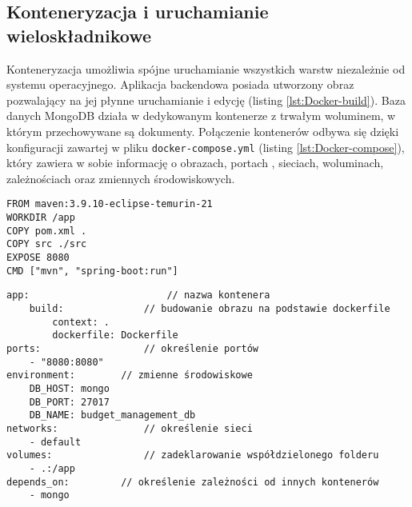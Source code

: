 \subsection*{Konteneryzacja i uruchamianie wieloskładnikowe}
Konteneryzacja umożliwia spójne uruchamianie wszystkich warstw niezależnie od systemu operacyjnego. Aplikacja backendowa posiada utworzony obraz pozwalający na jej płynne uruchamianie i edycję (listing \ref{lst:Docker-build}). Baza danych MongoDB działa w dedykowanym kontenerze z trwałym woluminem, w którym przechowywane są dokumenty. Połączenie kontenerów odbywa się dzięki konfiguracji zawartej w pliku \texttt{docker-compose.yml} (listing \ref{lst:Docker-compose}), który zawiera w sobie informację o obrazach, portach , sieciach, woluminach, zależnościach oraz zmiennych środowiskowych.
\begin{lstlisting}[caption={Budowanie obrazu - Dockerfile}, label={lst:Docker-build}]
FROM maven:3.9.10-eclipse-temurin-21
WORKDIR /app
COPY pom.xml .
COPY src ./src
EXPOSE 8080
CMD ["mvn", "spring-boot:run"]
\end{lstlisting}
\begin{lstlisting}[caption={Fragment pliku konfiguracyjnego compose.yml}, label={lst:Docker-compose}]
app:						// nazwa kontenera
	build:				// budowanie obrazu na podstawie dockerfile
		context: .
		dockerfile: Dockerfile
ports:					// określenie portów
	- "8080:8080"
environment:		// zmienne środowiskowe
	DB_HOST: mongo
	DB_PORT: 27017
	DB_NAME: budget_management_db
networks:				// określenie sieci
	- default
volumes:				// zadeklarowanie współdzielonego folderu 
	- .:/app
depends_on:			// określenie zależności od innych kontenerów
	- mongo
\end{lstlisting}